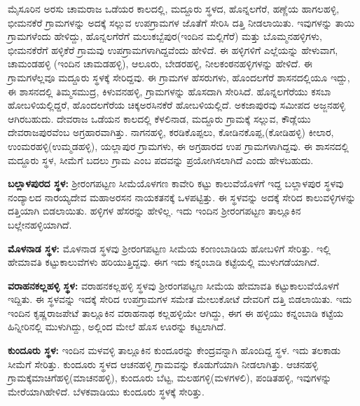 \vskip -1pt

ಮೈಸೂರಿನ ಅರಸು ಚಾಮರಾಜ ಒಡೆಯರ ಕಾಲದಲ್ಲಿ, ಮದ್ದೂರು ಸ್ಥಳದ, ಹೊನ್ನಲಗೆರೆ, ಹಣ್ಣೆಯ ಹಾಗಲಹಳ್ಳಿ, ಭೀಮನಕೆರೆ ಗ್ರಾಮಗಳನ್ನು ಅದಕ್ಕೆ ಸಲ್ಲುವ ಉಪಗ್ರಾಮಗಳ ಜೊತೆಗೆ ಸೇರಿಸಿ ದತ್ತಿ ನೀಡಲಾಯಿತು. ಇವುಗಳನ್ನು ತಾಯಿ ಗ್ರಾಮಗಳೆಂದು ಹೇಳಿದ್ದು, ಹೊನ್ನಲಗೆರೆಗೆ ಮಲುಕಬ್ಬೆಪುರ(ಇಂದಿನ ಮಲ್ಲಿಗೆರೆ) ಮತ್ತು ಬೊಮ್ಮನಹಳ್ಳಿಗಳು, ಭೀಮನಕೆರೆಗೆ ಹಳ್ಳಿಕೆರೆ ಗ್ರಾಮವು ಉಪಗ್ರಾಮಗಳಾಗಿದ್ದವೆಂದು ಹೇಳಿದೆ. ಈ ಹಳ್ಳಿಗಳಿಗೆ ಎಲ್ಲೆಯನ್ನು ಹೇಳುವಾಗ, ಚಾಮಂಡಹಳ್ಳಿ (ಇಂದಿನ ಚಾಮಡಹಳ್ಳಿ), ಆಲೂರು, ಬೇಡರಹಳ್ಳಿ, ನೀಲಕಂಠನಹಳ್ಳಿಗಳನ್ನು ಹೇಳಿದೆ. ಈ ಗ್ರಾಮಗಳೆಲ್ಲವೂ ಮದ್ದೂರು ಸ್ಥಳಕ್ಕೆ ಸೇರಿದ್ದವು. ಈ ಗ್ರಾಮಗಳ ಹೆಸರುಗಳು, ಹೊಂದಲಗೆರೆ ಶಾಸನದಲ್ಲಿಯೂ ಇದ್ದು, ಈ ಶಾಸನದಲ್ಲಿ ತಿಮ್ಮಸಮುದ್ರ, ಕಿಳುವನಹಳ್ಳಿ, ಗ್ರಾಮಗಳನ್ನು ಹೊಸದಾಗಿ ಸೇರಿಸಿದೆ. ಹೊನ್ನಲಗೆರೆಯು ಕಸಬಾ ಹೋಬಳಿಯಲ್ಲಿದ್ದರೆ, ಹೊಂದಲಗೆರೆಯ ಚಿಕ್ಕಅರಸಿನಕೆರೆ ಹೋಬಳಿಯಲ್ಲಿದೆ. ಅಕಜಾಪುರವು ಸಮೀಪದ ಅಜ್ಜನಹಳ್ಳಿ ಆಗಿರಬಹುದು. ದೇವರಾಜ ಒಡೆಯನ ಕಾಲದಲ್ಲಿ ಕೆಳಲಿನಾಡ, ಮದ್ದೂರು ಗ್ರಾಮಕ್ಕೆ ಸಲ್ಲುವ, ಕೌಡ್ಲೆಯು ದೇವರಾಜಪುರವೆಂಬ ಅಗ್ರಹಾರವಾಗಿತ್ತು. ನಾಗನಹಳ್ಳಿ, ಕರಡಿಕೊಪ್ಪಲು, ಕೋಡಿನಕೊಪ್ಪ,(ಕೋಡಿಹಳ್ಳಿ) ಕೀಲಾರ, ಉಂಮರಹಳ್ಳಿ(ಉಮ್ಮಡಹಳ್ಳಿ), ಯಲ್ಲಾಪುರ ಗ್ರಾಮಗಳು, ಈ ಅಗ್ರಹಾರದ ಉಪ ಗ್ರಾಮಗಳಾಗಿದ್ದವು. ಈ ಶಾಸನದಲ್ಲಿ ಮದ್ದೂರು ಸ್ಥಳ, ಸೀಮೆಗೆ ಬದಲು ಗ್ರಾಮ ಎಂಬ ಪದವನ್ನು ಪ್ರಯೋಗಿಸಲಾಗಿದೆ ಎಂದು ಹೇಳಬಹುದು.

\textbf{ಬಲ್ಲಾಳಪುರದ ಸ್ಥಳ:} ಶ‍್ರೀರಂಗಪಟ್ಟಣ ಸೀಮೆಯೊಳಗಣ ಕಾವೇರಿ ಕಟ್ಟು ಕಾಲುವೆಯೊಳಗೆ ಇದ್ದ ಬಲ್ಲಾಳಪುರ ಸ್ಥಳವು ನಂದ್ಯಾಲದ ನಾರಯ್ಯದೇವ ಮಹಾಅರಸನ ನಾಯಕತನಕ್ಕೆ ಒಳಪಟ್ಟಿತ್ತು. ಈ ಸ್ಥಳವನ್ನು ಅದಕ್ಕೆ ಸೇರಿದ ಕಾಲುವಳ್ಳಿಗಳನ್ನು ದತ್ತಿಯಾಗಿ ಬಿಡಲಾಯಿತು. ಹಳ್ಳಿಗಳ ಹೆಸರನ್ನು ಹೇಳಿಲ್ಲ. ಇದು ಇಂದಿನ ಶ‍್ರೀರಂಗಪಟ್ಟಣ ತಾಲ್ಲೂಕಿನ ಬಲ್ಲೇನಹಳ್ಳಿಯಾಗಿದೆ.

\textbf{ಮೊಳನಾಡ ಸ್ಥಳ:} ಮೊಳನಾಡ ಸ್ಥಳವು ಶ‍್ರೀರಂಗಪಟ್ಟಣ ಸೀಮೆಯ ಕಂಣಂಬಾಡಿಯ ಹೋಬಳಿಗೆ ಸೇರಿತ್ತು. ಇಲ್ಲಿ ಹೇಮಾವತಿ ಕಟ್ಟುಕಾಲುವೆಗಳು ಹರಿಯುತ್ತಿದ್ದವು. ಈಗ ಇದು ಕನ್ನಂಬಾಡಿ ಕಟ್ಟೆಯಲ್ಲಿ ಮುಳುಗಡೆಯಾಗಿದೆ.

\textbf{ವರಾಹನಕಲ್ಲಹಳ್ಳಿ ಸ್ಥಳ:} ವರಾಹನಕಲ್ಲಹಳ್ಳಿ ಸ್ಥಳವು ಶ‍್ರೀರಂಗಪಟ್ಟಣ ಸೀಮೆಯ ಹೇಮಾವತಿ ಕಟ್ಟುಕಾಲುವೆಯೊಳಗೆ ಇದ್ದಿತು. ಈ ಸ್ಥಳವನ್ನು ಇದಕ್ಕೆ ಸೇರಿದ ಉಪಗ್ರಾಮಗಳ ಸಮೇತ ಮೇಲುಕೋಟೆ ದೇವರಿಗೆ ದತ್ತಿ ಬಿಡಲಾಯಿತು. ಇದು ಇಂದಿನ ಕೃಷ್ಣರಾಜಪೇಟೆ ತಾಲ್ಲೂಕಿನ ವರಾಹನಾಥ ಕಲ್ಲಹಳ್ಳಿಯೇ ಆಗಿದ್ದು, ಈಗ ಈ ಹಳ್ಳಿಯು ಕನ್ನಂಬಾಡಿ ಕಟ್ಟೆಯ ಹಿನ್ನೀರಿನಲ್ಲಿ ಮುಳುಗಿದ್ದು, ಅಲ್ಲಿಂದ ಮೇಲೆ ಹೊಸ ಊರನ್ನು ಕಟ್ಟಲಾಗಿದೆ.

\textbf{ಕುಂದೂರು ಸ್ಥಳ:} ಇಂದಿನ ಮಳವಳ್ಳಿ ತಾಲ್ಲೂಕಿನ ಕುಂದೂರನ್ನು ಕೇಂದ್ರವನ್ನಾಗಿ ಹೊಂದಿದ್ದ ಸ್ಥಳ. ಇದು ತಲಕಾಡು ಸೀಮೆಗೆ ಸೇರಿತ್ತು. ಕುಂದೂರು ಸ್ಥಳದ ಆಚನಹಳ್ಳಿ ಗ್ರಾಮವನ್ನು ಕೊಡುಗೆಯಾಗಿ ನೀಡಲಾಗಿತ್ತು. ಆಚನಹಳ್ಳಿ ಗ್ರಾಮಕ್ಕೆ\break ಮಾಚಿಗೆಹಳ್ಳಿ(ಮಾಚನಹಳ್ಳಿ), ಕುಂದೂರು ಬೆಟ್ಟ, ಮಲಹಗಳ್ಳಿ(ಮಳಗಳಲಿ), ಪಂಡಿತಹಳ್ಳಿ, ಇವುಗಳನ್ನು ಮೇರೆಯಾಗಿ\break ಹೇಳಿದೆ. ಬೆಳಕವಾಡಿಯು ಕುಂದೂರು ಸ್ಥಳಕ್ಕೆ ಸೇರಿತ್ತು.

